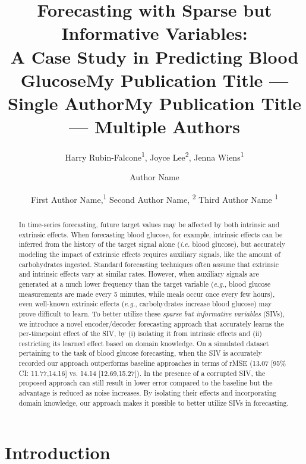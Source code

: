 \documentclass[letterpaper]{article}
\title{Forecasting with Sparse but Informative Variables:\\ A Case Study in Predicting Blood Glucose}
\author{
Harry Rubin-Falcone\textsuperscript{\rm 1}, Joyce Lee\textsuperscript{\rm 2}, Jenna Wiens\textsuperscript{\rm 1}
}
\title{My Publication Title --- Single Author}
\author {
Author Name
}
\title{My Publication Title --- Multiple Authors}
\author {

First Author Name,\textsuperscript{\rm 1}
Second Author Name, \textsuperscript{\rm 2}
Third Author Name \textsuperscript{\rm 1}
}
\begin{document}
\maketitle

\begin{abstract}
In time-series forecasting, future target values may be affected by both intrinsic and extrinsic effects. When forecasting blood glucose, for example, intrinsic effects can be inferred from the history of the target signal alone (\textit{i.e.} blood glucose), but accurately modeling the impact of extrinsic effects requires auxiliary signals, like the amount of carbohydrates ingested. Standard forecasting techniques often assume that extrinsic and intrinsic effects vary at similar rates. However, when auxiliary signals are generated at a much lower frequency than the target variable (\textit{e.g.}, blood glucose measurements are made every 5 minutes, while meals occur once every few hours), even well-known extrinsic effects (\textit{e.g.}, carbohydrates increase blood glucose) may prove difficult to learn. To better utilize these \textit{sparse but informative variables} (SIVs), we introduce a novel encoder/decoder forecasting approach that accurately learns the per-timepoint effect of the SIV, by (i) isolating it from intrinsic effects and (ii) restricting its learned effect based on domain knowledge. On a simulated dataset pertaining to the task of blood glucose forecasting, when the SIV is accurately recorded our approach outperforms baseline approaches in terms of rMSE (13.07 [95\% CI: 11.77,14.16] vs. 14.14 [12.69,15.27]). In the presence of a corrupted SIV, the proposed approach can still result in lower error compared to the baseline but the advantage is reduced as noise increases. By isolating their effects and incorporating domain knowledge, our approach makes it possible to better utilize SIVs in forecasting.
\end{abstract}
\section{Introduction}
\end{document}
